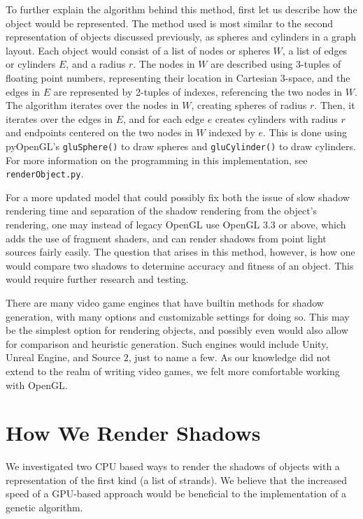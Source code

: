 \documentclass[10pt]{article}
\begin{document}
To further explain the algorithm behind this method, first let us describe how the object would be represented.  The method used is most similar to the second representation of objects discussed previously, as spheres and cylinders in a graph layout.  Each object would consist of a list of nodes or spheres $W$, a list of edges or cylinders $E$, and a radius $r$.  The nodes in $W$ are described using 3-tuples of floating point numbers, representing their location in Cartesian 3-space, and the edges in $E$ are represented by 2-tuples of indexes, referencing the two nodes in $W$.  The algorithm iterates over the nodes in $W$, creating spheres of radius $r$.  Then, it iterates over the edges in $E$, and for each edge $e$ creates cylinders with radius $r$ and endpoints centered on the two nodes in $W$ indexed by $e$.  This is done using pyOpenGL's \texttt{gluSphere()} to draw spheres and \texttt{gluCylinder()} to draw cylinders.  For more information on the programming in this implementation, see \texttt{renderObject.py}.\cite{gitrepo}

For a more updated model that could possibly fix both the issue of slow shadow rendering time and separation of the shadow rendering from the object's rendering, one may instead of legacy OpenGL use OpenGL 3.3 or above, which adds the use of fragment shaders, and can render shadows from point light sources fairly easily.  The question that arises in this method, however, is how one would compare two shadows to determine accuracy and fitness of an object.  This would require further research and testing.

There are many video game engines that have builtin methods for shadow generation, with many options and customizable settings for doing so.  This may be the simplest option for rendering objects, and possibly even would also allow for comparison and heuristic generation.  Such engines would include Unity, Unreal Engine, and Source 2, just to name a few.  As our knowledge did not extend to the realm of writing video games, we felt more comfortable working with OpenGL.

\section{How We Render Shadows}
We investigated two CPU based ways to render the shadows of objects with a representation of the first kind (a list of strands). We believe that the increased speed of a GPU-based approach would be beneficial to the implementation of a genetic algorithm.
\end{document}
